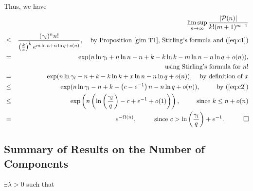 \documentclass{article}
\newtheorem{Proof of Theorem}{Proof of Theorem}
\begin{document}
Thus, we have
\begin{eqnarray*}
& & \limsup_{n \to \infty} \frac{|\mathcal{P}(n)|}{k!(m+1)^{m-1}} \\
& \leq & \frac{(\gamma_{l})^{n} n!}{ \left( \frac{k}{e} \right)^{k} e^{m \ln n + n \ln q + o(n)}}, 
\textrm{$\phantom{w}$ by Proposition~\ref{gim T1}, Stirling's formula and (\ref{eq:c1})} \\
& = & \exp (n \ln \gamma_{l} + n \ln n -n +k - k \ln k - m \ln n - n \ln q + o(n)), \\
& & \textrm{using Stirling's formula for $n!$} \\
& = & \exp (n \ln \gamma_{l} -n +k - k \ln k + x \ln n - n \ln q + o(n)), \phantom{w} 
\textrm{ by definition of } x \\
& \leq & \exp (n \ln \gamma_{l} -n +k -\left(c-e^{-1}\right)n - n \ln q + o(n)), 
\phantom{www} \textrm{ by } (\ref{eq:c2}) \\
& \leq & \exp \left(n \left(\ln \left( \frac{\gamma_{l}}{q} \right) -c + e^{-1} + o(1) \right) \right),
\phantom{www} \textrm{ since } k \leq n +o(n) \\
& = & e^{- \Omega (n)} 
\textrm{, $\phantom{www}$ since $c> \ln \left( \frac{\gamma_{l}}{q} \right) + e^{-1}$}.
\phantom{qwerty}
\setlength{\unitlength}{.25cm}
\begin{picture}(1,1)
\put(0,0){\line(1,0){1}}
\put(0,0){\line(0,1){1}}
\put(1,1){\line(-1,0){1}}
\put(1,1){\line(0,-1){1}}
\end{picture}
\end{eqnarray*} 














\newpage
\label{cptsum}
\subsection*{Summary of Results on the Number of Components}















$\exists \lambda >0$ such that
\end{document}
